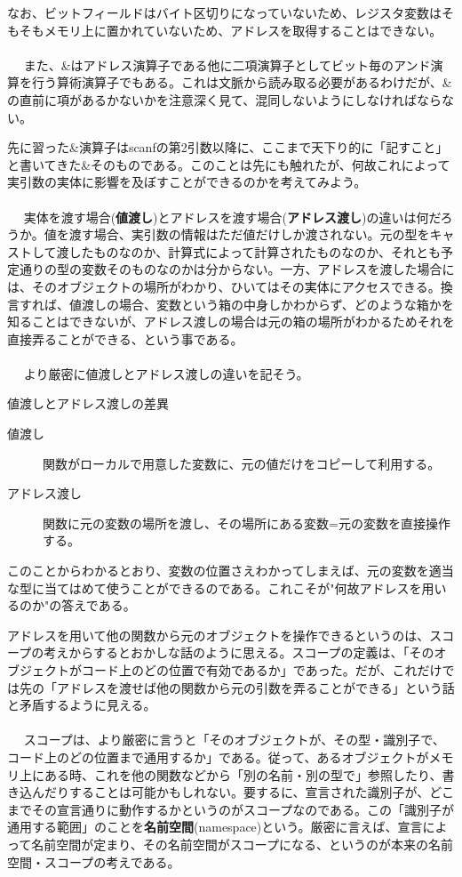 なお、ビットフィールドはバイト区切りになっていないため、レジスタ変数はそもそもメモリ上に置かれていないため、アドレスを取得することはできない。
\\ \\　
また、\&はアドレス演算子である他に二項演算子としてビット毎のアンド演算を行う算術演算子でもある。これは文脈から読み取る必要があるわけだが、\&の直前に項があるかないかを注意深く見て、混同しないようにしなければならない。

先に習った\&演算子はscanfの第2引数以降に、ここまで天下り的に「記すこと」と書いてきた\&そのものである。このことは先にも触れたが、何故これによって実引数の実体に影響を及ぼすことができるのかを考えてみよう。
\\ \\　
実体を渡す場合(\textbf{値渡し})とアドレスを渡す場合(\textbf{アドレス渡し})の違いは何だろうか。値を渡す場合、実引数の情報はただ値だけしか渡されない。元の型をキャストして渡したものなのか、計算式によって計算されたものなのか、それとも予定通りの型の変数そのものなのかは分からない。一方、アドレスを渡した場合には、そのオブジェクトの場所がわかり、ひいてはその実体にアクセスできる。換言すれば、値渡しの場合、変数という箱の中身しかわからず、どのような箱かを知ることはできないが、アドレス渡しの場合は元の箱の場所がわかるためそれを直接弄ることができる、という事である。
\\ \\　
より厳密に値渡しとアドレス渡しの違いを記そう。
\begin{itembox}[l]{値渡しとアドレス渡しの差異}
\begin{description}
\item[値渡し] 関数がローカルで用意した変数に、元の値だけをコピーして利用する。
\item[アドレス渡し] 関数に元の変数の場所を渡し、その場所にある変数=元の変数を直接操作する。
\end{description}
\end{itembox}
このことからわかるとおり、変数の位置さえわかってしまえば、元の変数を適当な型に当てはめて使うことができるのである。これこそが"何故アドレスを用いるのか"の答えである。

アドレスを用いて他の関数から元のオブジェクトを操作できるというのは、スコープの考えからするとおかしな話のように思える。スコープの定義は、「そのオブジェクトがコード上のどの位置で有効であるか」であった。だが、これだけでは先の「アドレスを渡せば他の関数から元の引数を弄ることができる」という話と矛盾するように見える。
\\ \\　
スコープは、より厳密に言うと「そのオブジェクトが、その型・識別子で、コード上のどの位置まで通用するか」である。従って、あるオブジェクトがメモリ上にある時、これを他の関数などから「別の名前・別の型で」参照したり、書き込んだりすることは可能かもしれない。要するに、宣言された識別子が、どこまでその宣言通りに動作するかというのがスコープなのである。この「識別子が通用する範囲」のことを\textbf{名前空間}(namespace)という。厳密に言えば、宣言によって名前空間が定まり、その名前空間がスコープになる、というのが本来の名前空間・スコープの考えである。

